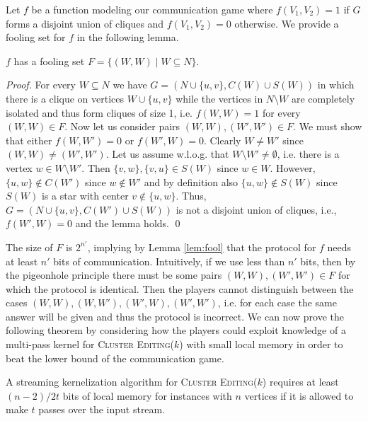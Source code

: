 \documentclass[draft,a4paper]{llncs}
\newcommand{\CEk}{\textsc{Cluster Editing($k$)}\xspace}
\begin{document}
Let $f$ be a function modeling our communication game where $f(V_1, V_2) = 1$ if $G$ forms a 
disjoint union of cliques and $f(V_1, V_2) = 0$ otherwise. We provide a fooling set for $f$ in the following lemma.

\begin{lemma} \label{lem:foolce}
$f$ has a fooling set $F = \big\{(W, W) \mid W \subseteq N \big\}$.
\end{lemma}

\begin{proof}
For every $W \subseteq N$ we have $G = (N \cup \{u, v\}, C(W) \cup S(W))$ in which there is a clique on vertices $W \cup \{u, v\}$ while the vertices in $N \setminus W$ are completely isolated and thus form cliques of size 1, i.e. $f(W, W)=1$ for every $(W, W) \in F$. Now let us consider pairs $(W, W), (W', W') \in F$. We must show that either $f(W, W') = 0$ or $f(W', W) = 0$.
Clearly $W \neq W'$ since $(W, W) \neq (W', W')$. Let us assume w.l.o.g. that $W \setminus W' \neq \emptyset$, i.e. there is a vertex $w \in W \setminus W'$. Then $\{v, w\}, \{v, u\} \in S(W)$ since $w \in W$. However, $\{u, w\} \notin C(W')$ since $w \notin W'$ and by definition also $\{u, w\} \notin S(W)$ since $S(W)$ is a star with center $v \notin \{u,  w\}$. Thus, $G = (N \cup \{u, v\}, C(W') \cup S(W))$ is not a disjoint union of cliques, i.e., $f(W', W) = 0$ and the lemma holds. \qed
\end{proof}

The size of $F$ is $2^{n'}$, implying by Lemma \ref{lem:fool} that the protocol for $f$ needs at least $n'$ bits of communication. Intuitively, if we use less than $n'$ bits, then by the pigeonhole principle there must be some pairs $(W, W), (W', W') \in F$ for which the protocol is identical. Then the players cannot distinguish between the cases $(W, W), (W, W'), (W', W), (W', W')$, i.e. for each case the same answer will be given and thus the protocol is incorrect. We can now prove the following theorem by considering how the players could exploit knowledge of a multi-pass kernel for \CEk with small local memory in order to beat the lower bound of the communication game.


\begin{theorem} \label{thm:ce}
 A streaming kernelization algorithm for \CEk requires at least $(n-2)/2t$ bits of local memory for instances with $n$ vertices if it is allowed to make $t$ passes over the input stream.
\end{theorem}
\end{document}
